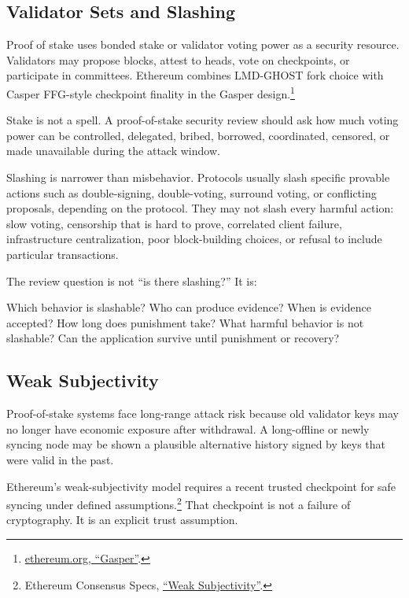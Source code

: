 \subsection{Validator Sets and Slashing}

Proof of stake uses bonded stake or validator voting power as a security resource. Validators may propose blocks, attest to heads, vote on checkpoints, or participate in committees. Ethereum combines LMD-GHOST fork choice with Casper FFG-style checkpoint finality in the Gasper design.\footnote{\href{https://ethereum.org/developers/docs/consensus-mechanisms/pos/gasper/}{ethereum.org, ``Gasper''}.}

Stake is not a spell. A proof-of-stake security review should ask how much voting power can be controlled, delegated, bribed, borrowed, coordinated, censored, or made unavailable during the attack window.

Slashing is narrower than misbehavior. Protocols usually slash specific provable actions such as double-signing, double-voting, surround voting, or conflicting proposals, depending on the protocol. They may not slash every harmful action: slow voting, censorship that is hard to prove, correlated client failure, infrastructure centralization, poor block-building choices, or refusal to include particular transactions.

The review question is not ``is there slashing?'' It is:

\begin{codeblock}
Which behavior is slashable?
Who can produce evidence?
When is evidence accepted?
How long does punishment take?
What harmful behavior is not slashable?
Can the application survive until punishment or recovery?
\end{codeblock}

\subsection{Weak Subjectivity}

Proof-of-stake systems face long-range attack risk because old validator keys may no longer have economic exposure after withdrawal. A long-offline or newly syncing node may be shown a plausible alternative history signed by keys that were valid in the past.

Ethereum's weak-subjectivity model requires a recent trusted checkpoint for safe syncing under defined assumptions.\footnote{Ethereum Consensus Specs, \href{https://ethereum.github.io/consensus-specs/specs/phase0/weak-subjectivity/}{``Weak Subjectivity''}.} That checkpoint is not a failure of cryptography. It is an explicit trust assumption.

